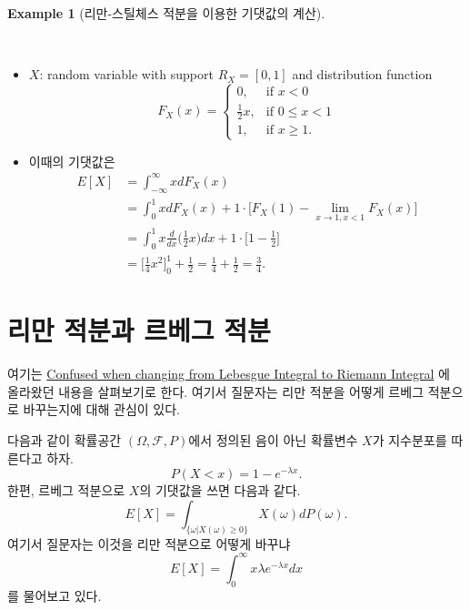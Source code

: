 \documentclass[
  letterpaper,
  DIV=11,
  numbers=noendperiod]{scrreprt}
\theoremstyle{definition}
\theoremstyle{plain}
\theoremstyle{plain}
\theoremstyle{definition}
\newtheorem{example}{Example}[chapter]
\theoremstyle{plain}
\theoremstyle{definition}
\theoremstyle{remark}
\begin{document}
\begin{example}[리만-스틸체스 적분을 이용한 기댓값의
계산]\protect\hypertarget{exm-riemmanstieltjesint01}{}\label{exm-riemmanstieltjesint01}

~

\begin{itemize}
\item
  \(X\): random variable with support \(R_X = [0,1]\) and distribution
  function \[
  F_X(x) = \begin{cases}
  0, &\text{if } x <0\\
  \frac{1}{2}x, &\text{if } 0 \leq x < 1\\
  1, &\text{if } x \geq 1.
  \end{cases}
  \]
\item
  이때의 기댓값은 \[
  \begin{aligned}
  E[X] &= \int_{-\infty}^{\infty} x dF_X(x)\\
  &= \int_0^1 xdF_{X}(x) + 1\cdot \Big[ F_X(1) -\lim_{x\rightarrow 1, x < 1}F_X(x) \Big]\\
  &= \int_0^1 x \frac{d}{dx} \Big(\frac{1}{2}x \Big) dx  + 1 \cdot \Big[ 1- \frac{1}{2} \Big]\\
  &= \Big[\frac{1}{4}x^2 \Big]_{0}^1 + \frac{1}{2} = \frac{1}{4}+\frac{1}{2}=\frac{3}{4}.
  \end{aligned}
  \]
\end{itemize}

\end{example}

\section{리만 적분과 르베그
적분}\label{uxb9acuxb9cc-uxc801uxbd84uxacfc-uxb974uxbca0uxadf8-uxc801uxbd84}

여기는
\href{https://math.stackexchange.com/questions/2958787/confused-when-changing-from-lebesgue-integral-to-riemann-integral}{Confused
when changing from Lebesgue Integral to Riemann Integral} 에 올라왔던
내용을 살펴보기로 한다. 여기서 질문자는 리만 적분을 어떻게 르베그
적분으로 바꾸는지에 대해 관심이 있다.

다음과 같이 확률공간 \((\Omega, \mathcal{F}, P)\)에서 정의된 음이 아닌
확률변수 \(X\)가 지수분포를 따른다고 하자. \[
P(X<x) = 1-e^{-\lambda x}.
\] 한편, 르베그 적분으로 \(X\)의 기댓값을 쓰면 다음과 같다. \[
E[X] = \int_{\{\omega | X(\omega) \geq 0 \}} X(\omega) dP(\omega).
\] 여기서 질문자는 이것을 리만 적분으로 어떻게 바꾸냐 \[
E[X] = \int_0^\infty x \lambda e^{-\lambda x}dx
\] 를 물어보고 있다.
\end{document}
